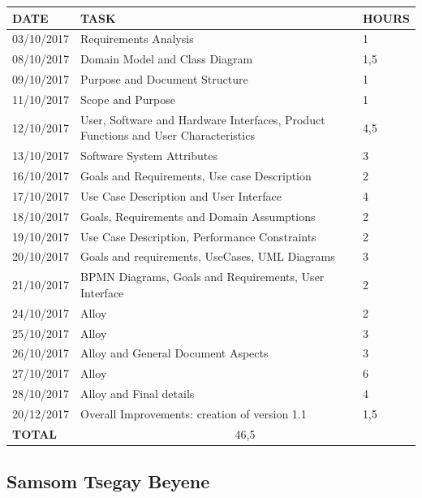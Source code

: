 \documentclass[12pt]{article}
\begin{document}
\begin{center}
\begin{tabular}{ |p{}|p{}|p{}| } 
 \hline
 \textbf{DATE} & \textbf{TASK} & \textbf{HOURS} \\ 
  \hline
 03/10/2017 & Requirements Analysis & 1 \\ 
  \hline
 08/10/2017 & Domain Model and Class Diagram & 1,5 \\ 
  \hline
  09/10/2017 & Purpose and Document Structure & 1 \\ 
  \hline
  11/10/2017 & Scope and Purpose & 1 \\ 
  \hline
  12/10/2017 & User, Software and Hardware Interfaces, Product Functions and User Characteristics & 4,5 \\ 
  \hline
  13/10/2017 & Software System Attributes & 3 \\ 
  \hline
  16/10/2017 & Goals and Requirements, Use case Description & 2 \\ 
  \hline
  17/10/2017 & Use Case Description and User Interface & 4 \\ 
  \hline
  18/10/2017 & Goals, Requirements and Domain Assumptions & 2 \\ 
  \hline
  19/10/2017 & Use Case Description, Performance Constraints & 2 \\ 
  \hline
  20/10/2017 & Goals and requirements, UseCases, UML Diagrams & 3 \\ 
  \hline
  21/10/2017 & BPMN Diagrams, Goals and Requirements, User Interface & 2 \\ 
  \hline
  24/10/2017 & Alloy & 2 \\ 
  \hline
  25/10/2017 & Alloy & 3 \\ 
  \hline
  26/10/2017 & Alloy and General Document Aspects & 3 \\ 
  \hline
  27/10/2017 & Alloy & 6 \\ 
  \hline
  28/10/2017 & Alloy and Final details & 4 \\ 
  \hline
  20/12/2017 & Overall Improvements: creation of version 1.1 & 1,5 \\ 
  \hline
  \textbf{TOTAL} & \multicolumn{2}{c|}{46,5} \\ 
  \hline
\end{tabular}
\end{center}

\subsection{Samsom Tsegay Beyene}
\end{document}
